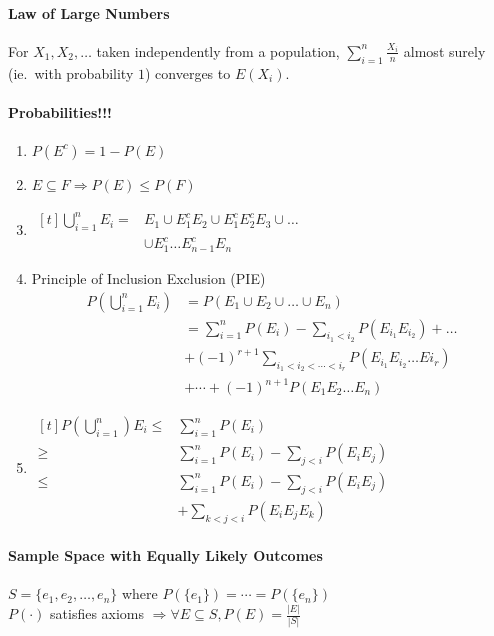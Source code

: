 \paragraph{Law of Large Numbers}
For \(X_1,X_2,\ldots\) taken independently from a population,
\(\sum\limits_{i=1}^{n}\frac{X_i}{n}\) almost surely (ie.\ with probability $1$) converges to \(E(X_i)\).
\paragraph{Probabilities!!!}
\begin{enumerate}
  \item \(P(E^c) = 1 - P(E)\)
  \item \(E\subseteq F\Rightarrow P(E) \le P(F) \)
  \item $\begin{aligned}[t]
      \bigcup\limits_{i=1}^{n}E_i=&E_1\cup E_1^{c}E_2\cup E_1^{c}E_2^{c}E_3\cup…\\
                                  &\cup E_1^c\ldots E_{n-1}^{c}E_n
    \end{aligned}$
  \item Principle of Inclusion Exclusion (PIE)
    \begin{equation*}
      \begin{split}
        P(\bigcup\limits_{i=1}^n E_i)	& =P(E_1\cup E_2\cup\ldots\cup E_n)\\
          & =\sum\limits_{i=1}^{n}P(E_i)-\sum\limits_{i_1<i_2}P(E_{i_1}E_{i_2})+\ldots\\
          & +{(-1)}^{r+1}\sum\limits_{i_1<i_2<\cdots<i_r}P(E_{i_1}E_{i_2}\ldots E{i_r})\\
          & +\cdots+{(-1)}^{n+1}P(E_1E_2\ldots E_n)
      \end{split}
    \end{equation*}
  \item $\begin{aligned}[t]
      P(\bigcup\limits_{i=1}^n)E_i\le&\sum\limits_{i=1}^{n}P(E_i)\\
      \ge&\sum\limits_{i=1}^{n}P(E_i)-\sum\limits_{j<i}P(E_{i}E_j)\\
      \le&\sum\limits_{i=1}^{n}P(E_i)-\sum\limits_{j<i}P(E_{i}E_j)\\
         &+\sum\limits_{k<j<i}P(E_{i}E_{j}E_{k})
    \end{aligned}$
\end{enumerate}
\paragraph{Sample Space with Equally Likely Outcomes}
\(S=\{e_1,e_2,\ldots,e_n\}\) where \(P(\{e_1\}) = \cdots = P(\{e_n\})\)\\
\(P(\cdot)\) satisfies axioms \(\Rightarrow\forall E\subseteq S, P(E)=\frac{|E|}{|S|}\)
